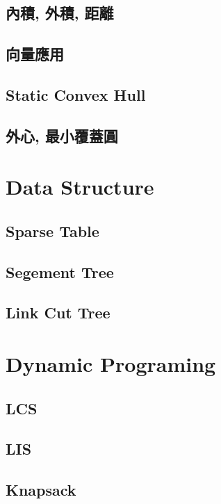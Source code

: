 \subsection{內積, 外積, 距離} 

\subsection{向量應用} 

\subsection{Static Convex Hull} 

\subsection{外心, 最小覆蓋圓} 


\section{Data Structure}
\subsection{Sparse Table}

\subsection{Segement Tree}

\subsection{Link Cut Tree}


\section{Dynamic Programing}
\subsection{LCS}

\subsection{LIS}

\subsection{Knapsack}

